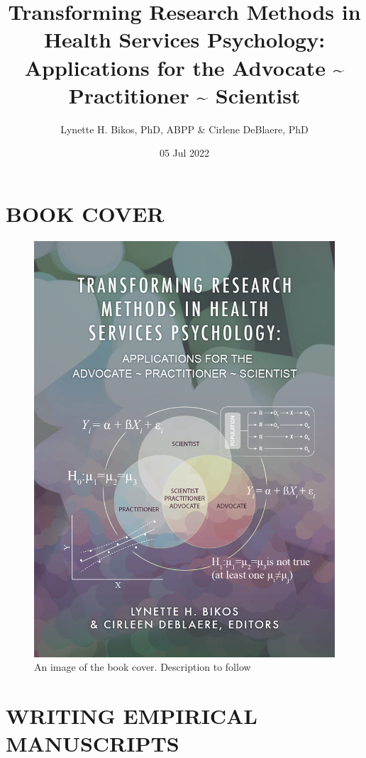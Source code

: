 \documentclass[
  11pt,
]{book}
\title{Transforming Research Methods in Health Services Psychology: Applications for the Advocate \textasciitilde{} Practitioner \textasciitilde{} Scientist}
\author{Lynette H. Bikos, PhD, ABPP \& Cirlene DeBlaere, PhD}
\date{05 Jul 2022}
\begin{document}
\maketitle

{
\hypersetup{linkcolor=}
\setcounter{tocdepth}{3}
\tableofcontents
}
\hypertarget{book-cover}{%
\chapter*{BOOK COVER}\label{book-cover}}

\begin{figure}
\centering
\includegraphics{images/bookcover.png}
\caption{An image of the book cover. Description to follow}
\end{figure}

\hypertarget{writing-empirical-manuscripts}{%
\chapter*{WRITING EMPIRICAL MANUSCRIPTS}\label{writing-empirical-manuscripts}}
\end{document}
